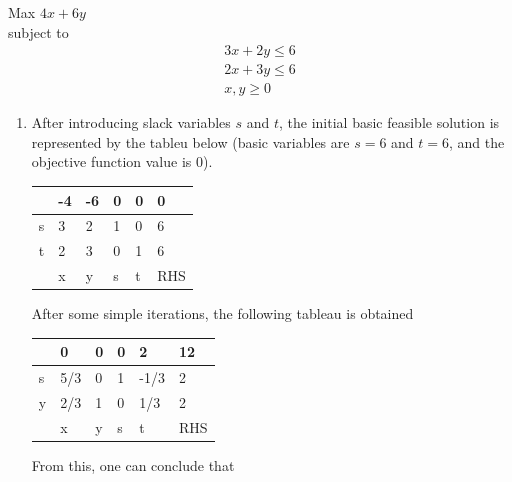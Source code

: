 \documentclass[journal,12pt,onecolumn]{IEEEtran}
\begin{document}
Max $4x + 6y$\\
subject to
\begin{align}
    3x+2y\le6 \\
    2x+3y\le6 \\
    x,y\ge0
\end{align}
\begin{enumerate}[resume]
    \item After introducing slack variables $s$ and $t$, the initial basic feasible solution is represented by the tableu below (basic variables are $s=6$ and $t=6$, and the objective function value is 0).
          \begin{table}[H]
              \centering\large
              \begin{tabular}{|l|l|l|l|l|l|}
                  \hline
                    & -4 & -6 & 0 & 0 & 0   \\\hline
                  s & 3  & 2  & 1 & 0 & 6   \\\hline
                  t & 2  & 3  & 0 & 1 & 6   \\\hline
                    & x  & y  & s & t & RHS \\\hline
              \end{tabular}
              \label{t74}
          \end{table}
          After some simple iterations, the following tableau is obtained
          \begin{table}[H]
              \centering\large
              \begin{tabular}{|l|l|l|l|l|l|}
                  \hline
                    & 0   & 0 & 0 & 2    & 12  \\\hline
                  s & 5/3 & 0 & 1 & -1/3 & 2   \\\hline
                  y & 2/3 & 1 & 0 & 1/3  & 2   \\\hline
                    & x   & y & s & t    & RHS \\\hline
              \end{tabular}
              \label{}
          \end{table}
          From this, one can conclude that

          \begin{enumerate}
          \end{enumerate}


\end{enumerate}
\end{document}
